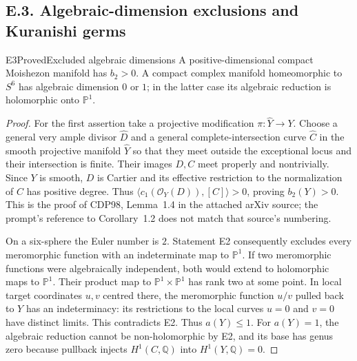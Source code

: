 \subsection{E.3. Algebraic-dimension exclusions and Kuranishi germs}


\begin{statement}{E3}{Proved}{Excluded algebraic dimensions}
A positive-dimensional compact Moishezon manifold has $b_2>0$.
A compact complex manifold homeomorphic to $S^6$ has algebraic
dimension $0$ or $1$; in the latter case its algebraic reduction is
holomorphic onto $\mathbb P^1$.
\end{statement}
\begin{proof}
For the first assertion take a projective modification
$\pi:\widehat Y\to Y$. Choose a general very ample divisor
$\widehat D$ and a general complete-intersection curve
$\widehat C$ in the smooth projective manifold $\widehat Y$ so that
they meet outside the exceptional locus and their intersection is
finite. Their images $D,C$ meet properly and nontrivially. Since $Y$
is smooth, $D$ is Cartier and its effective restriction to the
normalization of $C$ has positive degree. Thus
$\langle c_1(\mathcal O_Y(D)),[C]\rangle>0$, proving $b_2(Y)>0$.
This is the proof of CDP98, Lemma~1.4 in the attached arXiv source;
the prompt's reference to Corollary~1.2 does not match that source's
numbering.

On a six-sphere the Euler number is $2$. Statement E2 consequently
excludes every meromorphic function with an indeterminate map to
$\mathbb P^1$. If two meromorphic functions were algebraically
independent, both would extend to holomorphic maps to
$\mathbb P^1$. Their product map to $\mathbb P^1\times\mathbb P^1$
has rank two at some point. In local target coordinates $u,v$
centred there, the meromorphic function $u/v$ pulled back to $Y$
has an indeterminacy: its restrictions to the local curves
$u=0$ and $v=0$ have distinct limits. This contradicts E2.
Thus $a(Y)\leq1$. For $a(Y)=1$, the algebraic reduction cannot be
non-holomorphic by E2, and its base has genus zero because pullback
injects $H^1(C,\mathbb Q)$ into $H^1(Y,\mathbb Q)=0$.
\end{proof}



